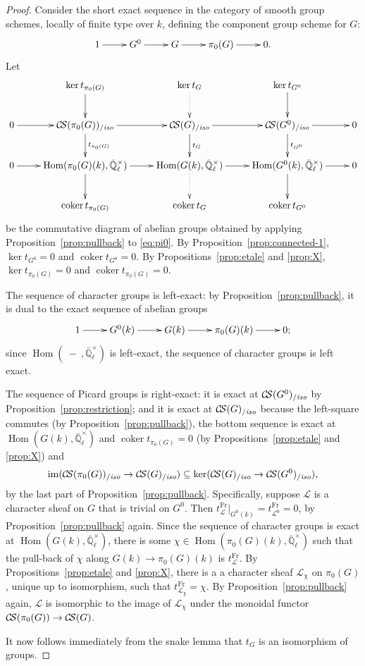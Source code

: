 \documentclass[11pt]{amsart}
\theoremstyle{plain}
\theoremstyle{definition}
\theoremstyle{remark}
\newcommand{\EE}{\mathbb{\bar Q}_\ell}
\newcommand{\Fq}{k}
\newcommand{\EEx}{\EE^\times}
\newcommand{\Frob}{{\operatorname{Fr}}}
\DeclareMathOperator{\Hom}{Hom}
\DeclareMathOperator{\coker}{coker}
\newcommand{\cs}[1]{{\mathcal{#1}}}
\newcommand{\CS}{{\mathcal{C\hskip-1.8pt S}}}
\newcommand{\CSiso}[1]{\CS(#1)_{/\textit{iso}}}
\newcommand{\image}{{\operatorname{im}}}
\begin{document}
\begin{proof}
  Consider the short exact sequence in the category of smooth group
  schemes, locally of finite type over $\Fq$, defining the component
  group scheme for $G$:
  \begin{equation}\label{eq:pi0}
    \xymatrix{
      1 \ar[r] & G^0 \ar[r] & G \ar[r] & \pi_0(G) \ar[r] & 0.
      }
  \end{equation}
  Let
  \[
  \xymatrix{
    & \ar[d] \ker t_{\pi_0(G)} & \ar@{.>}[d] \ker t_{G} & \ar[d] \ker t_{G^0} & \\
    0\ar[r] & \ar[d]^{t_{\pi_0(G)}} \CSiso{\pi_0(G)} \ar[r]
    & \ar[d]^{t_{G}} \CSiso{G} \ar[r] & \ar[d]^{t_{G^0}} \CSiso{G^0} \ar[r] & 0\\
    0 \ar[r] & \ar[d] \Hom(\pi_0(G)(\Fq),\EEx) \ar[r]
    & \ar@{.>}[d] \Hom(G(\Fq),\EEx) \ar[r] & \ar[d] \Hom(G^0(\Fq),\EEx) \ar[r] & 0\\
    & \coker t_{\pi_0(G)} & \coker t_{G} &  \coker t_{G^0} & \\
    }
  \]
  be the commutative diagram of abelian groups obtained by applying
  Proposition~\ref{prop:pullback} to \eqref{eq:pi0}.  By
  Proposition~\ref{prop:connected-1}, $\ker t_{G^0} =0$ and $\coker t_{G^0}=0$.
  By Propositions~\ref{prop:etale} and \ref{prop:X}, $\ker t_{\pi_0(G)}=0$
  and $\coker t_{\pi_0(G)}=0$.

  The sequence of character groups is left-exact: by
  Proposition~\ref{prop:pullback}, it is dual to the exact sequence of
  abelian groups
  \begin{equation}\label{eq:pi1}
    \xymatrix{
      1 \ar[r] & G^0(\Fq) \ar[r] & G(\Fq) \ar[r] & \pi_0(G)(\Fq) \ar[r] & 0;
    }
  \end{equation}
  since $\Hom(\ - \ ,\EEx)$ is left-exact, the sequence of
  character groups is left exact.

  The sequence of Picard groups is right-exact: it is exact at
  $\CSiso{G^0}$ by Proposition~\ref{prop:restriction}; and
  it is exact at $\CSiso{G}$ because the left-square
  commutes (by Proposition~\ref{prop:pullback}), the bottom sequence
  is exact at $\Hom(G(\Fq),\EEx)$ and $\coker t_{\pi_0(G)} =0$
  (by Propositions~\ref{prop:etale} and \ref{prop:X}) and
  \[
  \image(\CSiso{\pi_0(G)} \to \CSiso{G}) \subseteq \ker(\CSiso{G} \to \CSiso{G^0}),
  \]
  by the last part of Proposition~\ref{prop:pullback}. Specifically,
  suppose $\cs{L}$ is a character sheaf on $G$ that is trivial on
  $G^0$. Then $t^\Frob_\cs{L}\vert_{G^0(\Fq)} = t^\Frob_{\cs{L}^0} =0$,
  by Proposition~\ref{prop:pullback} again. Since the sequence of
  character groups is exact at $\Hom(G(\Fq),\EEx)$, there is
  some $\chi \in \Hom(\pi_0(G)(\Fq),\EEx)$ such that the
  pull-back of $\chi$ along $G(\Fq)\to \pi_0(G)(\Fq)$ is
  $t^\Frob_\cs{L}$. By Propositions~\ref{prop:etale} and \ref{prop:X},
  there is a a character sheaf $\cs{L}_\chi$ on $\pi_0(G)$, unique up
  to isomorphism, such that $t^\Frob_{\cs{L}_\chi} = \chi$. By
  Proposition~\ref{prop:pullback} again, $\cs{L}$ is isomorphic to the
  image of $\cs{L}_\chi$ under the monoidal functor $\CS(\pi_0(G)) \to \CS(G)$.

  It now follows immediately from the snake lemma that $t_{G}$ is an
  isomorphism of groups.
\end{proof}
\end{document}
